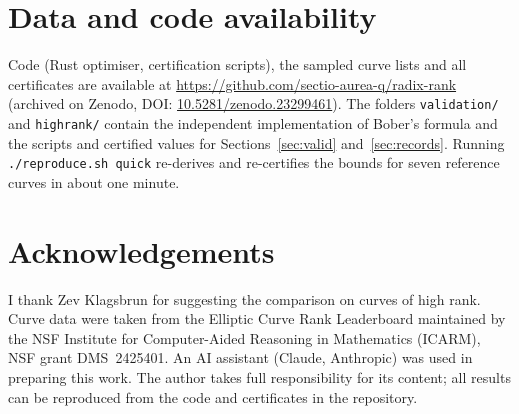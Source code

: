 \documentclass[11pt]{amsart}
\theoremstyle{remark}
\theoremstyle{definition}
\begin{document}
\section*{Data and code availability}
Code (Rust optimiser, certification scripts), the sampled curve lists and all certificates are available at \url{https://github.com/sectio-aurea-q/radix-rank} (archived on Zenodo, DOI: \href{https://doi.org/10.5281/zenodo.23299461}{10.5281/zenodo.23299461}). The folders \texttt{validation/} and \texttt{highrank/} contain the independent implementation of Bober's formula and the scripts and certified values for Sections~\ref{sec:valid} and~\ref{sec:records}. Running \texttt{./reproduce.sh quick} re-derives and re-certifies the bounds for seven reference curves in about one minute.

\section*{Acknowledgements}
I thank Zev Klagsbrun for suggesting the comparison on curves of high rank. Curve data were taken from the Elliptic Curve Rank Leaderboard maintained by the NSF Institute for Computer-Aided Reasoning in Mathematics (ICARM), NSF grant DMS~2425401. An AI assistant (Claude, Anthropic) was used in preparing this work. The author takes full responsibility for its content; all results can be reproduced from the code and certificates in the repository.
\end{document}
